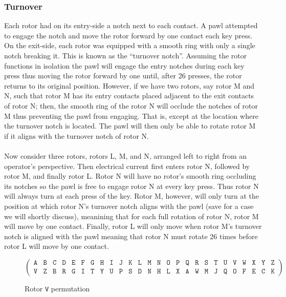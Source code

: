 \subsubsection{Turnover}
Each rotor had on its entry-side a notch next to each contact. A pawl
attempted to engage
the notch and move the rotor forward by one contact each key press.
On the exit-side, each
rotor was equipped with a smooth ring with only a single notch
breaking it. This is known as the ``turnover notch''. Assuming the
rotor functions in isolation the pawl will engage the entry notches
during each key press thus moving the rotor forward by one until,
after 26 presses, the rotor returns to its original position.
However, if we have two rotors, say rotor M and N, such that rotor M
has its entry contacts placed adjacent to the exit contacts of rotor
N; then, the smooth ring of the rotor N will occlude the notches of
rotor M thus preventing the pawl from engaging. That is, except at
the location where the turnover notch is located. The pawl will then
only be able to rotate rotor M if it aligns with the turnover notch of rotor N.
\\\\Now consider three rotors, rotors L, M, and N, arranged left to
right from an operator's perspective. Then electrical current first
enters rotor N, followed by rotor M, and finally rotor L. Rotor N
will have no rotor's smooth ring occluding its notches so the pawl is
free to engage rotor N at every key press. Thus rotor N will always
turn at each press of the key. Rotor M, however, will only turn at
the position at which rotor N's turnover notch aligns with the pawl (save for a case we will shortly discuss),
meanining that for each full rotation of rotor N, rotor M will move
by one contact. Finally, rotor L will only move when rotor M's
turnover notch is aligned with the pawl meaning that rotor N must
rotate 26 times before rotor L will move by one contact.

\begin{center}
	\begin{figure}[h]
		\[
			\left(
			\begin{array}{llllllllllllllllllllllllll}
					\texttt{A} & \texttt{B} & \texttt{C} & \texttt{D} &
					\texttt{E} & \texttt{F} & \texttt{G} & \texttt{H} &
					\texttt{I} & \texttt{J} & \texttt{K} & \texttt{L} &
					\texttt{M} & \texttt{N} & \texttt{O} & \texttt{P} &
					\texttt{Q} & \texttt{R} & \texttt{S} & \texttt{T} &
					\texttt{U} & \texttt{V} & \texttt{W} & \texttt{X} &
					\texttt{Y} & \texttt{Z}                             \\
					\texttt{V} & \texttt{Z} & \texttt{B} & \texttt{R} &
					\texttt{G} & \texttt{I} & \texttt{T} & \texttt{Y} &
					\texttt{U} & \texttt{P} & \texttt{S} & \texttt{D} &
					\texttt{N} & \texttt{H} & \texttt{L} & \texttt{X} &
					\texttt{A} & \texttt{W} & \texttt{M} & \texttt{J} &
					\texttt{Q} & \texttt{O} & \texttt{F} & \texttt{E} &
					\texttt{C} & \texttt{K}
				\end{array}
			\right)
		\]
		\caption{Rotor \texttt{V} permutation}
		\label{fig:rotor_v_wiring}
	\end{figure}
\end{center}

